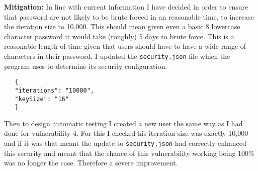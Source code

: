 \textbf{Mitigation:} In line with current information I have decided in order to ensure that password are not likely to be brute forced in an reasonable time, to increase the
iteration size to 10,000\cite{10.1007/978-3-030-11437-4_8}. This should mean given even a basic 8 lowercase character password it would take (roughly) 5 days to brute force. This is a reasonable length of time
given that users should have to have a wide range of characters in their password. I updated the \verb|security.json| file which the program uses to determine its security
configuration.
\begin{verbatim}
   {
   "iterations": "10000",
   "keySize": "16"
   }
\end{verbatim}
Then to design automatic testing I created a new user the same way as I had done for vulnerability 4. For this I checked his iteration size was exactly 10,000 and if it was that
meant the update to \verb|security.json| had correctly enhanced this security and meant that the chance of this vulnerability working being 100\% was no longer the case. Therefore
a severe improvement.
